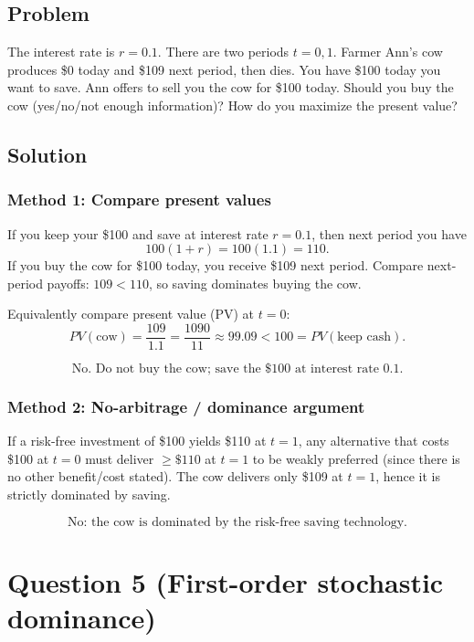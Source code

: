 \documentclass[12pt]{article}
\begin{document}
\subsection*{Problem}
The interest rate is \(r=0.1\). There are two periods \(t=0,1\).
Farmer Ann's cow produces \$0 today and \$109 next period, then dies.
You have \$100 today you want to save. Ann offers to sell you the cow for \$100 today.
Should you buy the cow (yes/no/not enough information)? How do you maximize the present value?

\subsection*{Solution}

\subsubsection*{Method 1: Compare present values}
If you keep your \$100 and save at interest rate \(r=0.1\), then next period you have
\[
100(1+r)=100(1.1)=110.
\]
If you buy the cow for \$100 today, you receive \$109 next period.
Compare next-period payoffs: \(109<110\), so saving dominates buying the cow.

Equivalently compare present value (PV) at \(t=0\):
\[
PV(\text{cow})=\frac{109}{1.1}=\frac{1090}{11}\approx 99.09 < 100 = PV(\text{keep cash}).
\]

\[
\boxed{\text{No. Do not buy the cow; save the \$100 at interest rate }0.1.}
\]

\subsubsection*{Method 2: No-arbitrage / dominance argument}
If a risk-free investment of \$100 yields \$110 at \(t=1\), any alternative that costs \$100 at \(t=0\) must deliver \(\ge \$110\) at \(t=1\) to be weakly preferred (since there is no other benefit/cost stated).
The cow delivers only \$109 at \(t=1\), hence it is strictly dominated by saving.

\[
\boxed{\text{No: the cow is dominated by the risk-free saving technology.}}
\]

\newpage
\section*{Question 5 (First-order stochastic dominance)}
\end{document}
